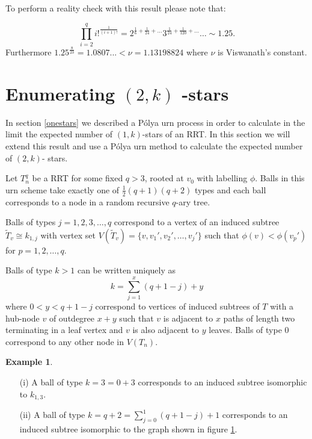 \documentclass[12pt]{article} %
\theoremstyle{definition}
\newtheorem{ex}[thm]{Example}
\begin{document}
To perform a reality check with this result please note that:

\begin{equation}\label{eq6}
 \prod_{i=2}^{q}i!^{\frac{1}{(i+1)!}} = 2^{\frac{1}{6} + \frac{1}{24} + \dots}3^{\frac{1}{24} + \frac{1}{120} + \dots }\dots \sim 1.25.
 \end{equation}
Furthermore  $1.25^{\frac{8}{23}} = 1.0807...< \nu = 1.13198824$ where $\nu$ is Viswanath's constant.  


\section{Enumerating $(2,k)$ -stars}
In section \ref{onestars} we described a P\'{o}lya urn process in order to calculate in the limit the expected number of $(1,k)$-stars of an RRT.  In this section we will extend this result and use a P\'{o}lya urn method to calculate the expected number of $(2,k)$- stars.  

Let $T_{n}^{q}$ be a RRT for some fixed $q >3$, rooted at $v_{0}$ with labelling  $\phi$.  Balls in this urn scheme take exactly one of $\frac{1}{2}(q+1)(q+2)$ types and each ball corresponds to a node in a random recursive $q$-ary tree. 

Balls of types $j = 1,2,3,\dots,q$ correspond to a vertex of an induced subtree $\tilde{T}_{v}\cong k_{1,j}$ with vertex set $V(\tilde{T}_{v}) = \{ v,v_{1}',v_{2}',\dots,v_{j}'\}$ such that $\phi(v) < \phi(v_{p}') $ for $p = 1,2,\dots,q$. 

Balls of type $k > 1$ can be written uniquely as 
\[k= \sum_{j=1}^{x}(q+ 1 -j) + y\]
where $0 < y < q+1 -j$  correspond to vertices of induced subtrees of $T$ with a hub-node $v$ of outdegree $x+y$ such that $v$ is adjacent to $x$ paths of length two terminating in a leaf vertex and $v$ is also adjacent to $y$ leaves.  Balls of type 0 correspond to any other node in $V(T_{n})$.
\begin{ex}
\begin{itemize}
 \item [(i)] A ball of type $k = 3 = 0 + 3$ corresponds to an induced subtree isomorphic to $k_{1,3}$.
 \item[(ii)] A ball of type $k = q + 2 = \sum_{j=0}^{1}(q+ 1 -j) + 1$ corresponds to an induced subtree isomorphic to the graph shown in figure \ref{fig:4}.
\end{itemize}
\end{ex}

 \begin{figure}[h]
\centering
{}
\caption{}\label{fig:4}
\end{figure}
\end{document}
